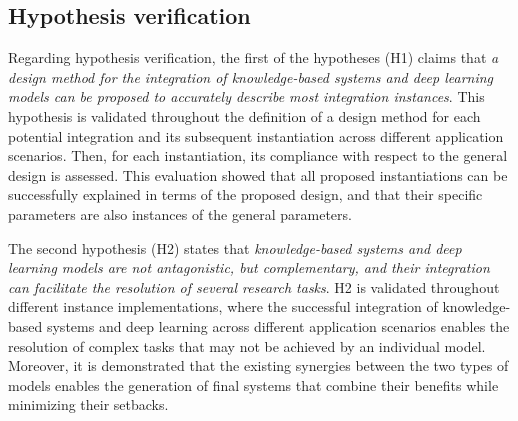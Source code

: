 \subsection{Hypothesis verification}
Regarding hypothesis verification, the first of the hypotheses (H1) claims that \textit{a design method for the integration of knowledge-based systems and deep learning models can be proposed to accurately describe most integration instances}. This hypothesis is validated throughout the definition of a design method for each potential integration and its subsequent instantiation across different application scenarios. Then, for each instantiation, its compliance with respect to the general design is assessed. This evaluation showed that all proposed instantiations can be successfully explained in terms of the proposed design, and that their specific parameters are also instances of the general parameters. 

The second hypothesis (H2) states that \textit{knowledge-based systems and deep learning models are not antagonistic, but complementary, and their integration can facilitate the resolution of several research tasks}. H2 is validated throughout different instance implementations, where the successful integration of knowledge-based systems and deep learning across different application scenarios enables the resolution of complex tasks that may not be achieved by an individual model. Moreover, it is demonstrated that the existing synergies between the two types of models enables the generation of final systems that combine their benefits while minimizing their setbacks.

